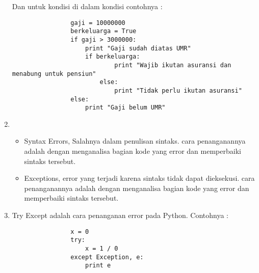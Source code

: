 \begin{enumerate}
				Dan untuk kondisi di dalam kondisi contohnya :
				
				\begin{lstlisting}
				gaji = 10000000
				berkeluarga = True
				if gaji > 3000000:
					print "Gaji sudah diatas UMR"
					if berkeluarga:
							print "Wajib ikutan asuransi dan menabung untuk pensiun"
						else:
							print "Tidak perlu ikutan asuransi"
				else:
					print "Gaji belum UMR"
				\end{lstlisting}

			\item \begin{itemize}
					\item Syntax Errors, Salahnya dalam penulisan sintaks.
					cara penanganannya adalah dengan menganalisa bagian kode yang error dan memperbaiki sintaks tersebut.
					
					\item Exceptions, error yang terjadi karena sintaks tidak dapat dieksekusi.
					cara penanganannya adalah dengan menganalisa bagian kode yang error dan memperbaiki sintaks tersebut.
				\end{itemize}
			
			\item Try Except adalah cara penanganan error pada Python.
			Contohnya : 
				\begin{lstlisting}
				x = 0
				try:
					x = 1 / 0
				except Exception, e:
					print e
				\end{lstlisting}

		\end{enumerate}
		
